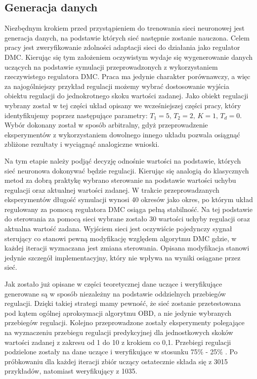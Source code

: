 \subsection{Generacja danych}
Niezbędnym krokiem przed przystąpieniem do trenowania sieci neuronowej jest generacja danych, na podstawie których sieć następnie zostanie nauczona. Celem pracy jest zweryfikowanie zdolności adaptacji sieci do działania jako regulator DMC. Kierując się tym założeniem oczywistym wydaje się wygenerowanie danych uczących na podstawie symulacji przeprowadzonych z wykorzystaniem rzeczywistego regulatora DMC. Praca ma jedynie charakter porównawczy, a więc za najogólniejszy przykład regulacji możemy wybrać dostosowanie wyjścia obiektu regulacji do jednokrotnego skoku wartości zadanej. Jako obiekt regulacji wybrany został w tej części układ opisany we wcześniejszej części pracy, który identyfikujemy poprzez następujące parametry: \( T_1=5, \, T_2=2, \, K=1, \, T_d=0 \). Wybór dokonany został w sposób arbitralny, gdyż przeprowadzenie eksperymentów z wykorzystaniem dowolnego innego układu pozwala osiągnąć zbliżone rezultaty i wyciągnąć analogiczne wnioski.
\par Na tym etapie należy podjąć decyzję odnośnie wartości na podstawie, których sieć neuronowa dokonywać będzie regulacji. Kierując się analogią do klasycznych metod za dobrą praktykę wybrano sterowanie na podstawie wartości uchybu regulacji oraz aktualnej wartości zadanej. W trakcie przeprowadzanych eksperymentów długość symulacji wynosi 40 okresów jako okres, po którym układ regulowany za pomocą regulatora DMC osiąga pełną stabilność. Na tej podstawie do sterowania za pomocą sieci wybrane zostało 30 wartości uchyby regulacji oraz aktualna wartość zadana. Wyjściem sieci jest oczywiście pojedynczy sygnał sterujący co stanowi pewną modyfikację względem algorytmu DMC gdzie, w każdej iteracji wyznaczana jest zmiana sterowania. Opisana modyfikacja stanowi jedynie szczegół implementacyjny, który nie wpływa na wyniki osiągane przez sieć.
\par Jak zostało już opisane w części teoretycznej dane uczące i weryfikujące generowane są w sposób niezależny na podstawie oddzielnych przebiegów regulacji. Dzięki takiej strategi mamy pewność, że sieć zostanie przetestowana pod kątem ogólnej aproksymacji algorytmu OBD, a nie jedynie wybranych przebiegów regulacji. Kolejno przeprowadzone zostały eksperymenty polegające na wyznaczeniu przebiegu regulacji predykcyjnej dla jednostkowych skoków wartości zadanej z zakresu od 1 do 10 z krokiem co 0,1. Przebiegi regulacji podzielone zostały na dane uczące i weryfikujące w stosunku 75\% - 25\% . Po próbkowaniu dla każdej iteracji zbiór uczący ostatecznie składa się z 3015 przykładów, natomiast weryfikujący z 1035.
